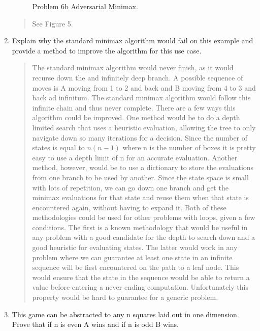 \documentclass[11pt]{article}
\newenvironment{problem}[2][Problem]{\begin{trivlist}
\item[\hskip \labelsep {\bfseries #1}\hskip \labelsep {\bfseries #2.}]}{\end{trivlist}}
\begin{document}
\begin{problem}{6}
\begin{enumerate}
\begin{figure}
			\caption{Problem 6b Adversarial Minimax.}
			\label{fig.bfs}
		\end{figure}
		\begin{verse}
			See Figure 5.
		\end{verse}
	\item Explain why the standard minimax algorithm would fail on this example and provide a method to improve the algorithm for this use case.
	\begin{verse}
		The standard minimax algorithm would never finish, as it would recurse down the and infinitely deep branch. A possible sequence of moves is A moving from 1 to 2 and back and B moving from 4 to 3 and back ad infinitum. The standard minimax algorithm would follow this infinite chain and thus never complete. There are a few ways this algorithm could be improved. One method would be to do a depth limited search that uses a heuristic evaluation, allowing the tree to only navigate down so many iterations for a decision. Since the number of states is equal to $n(n-1)$ where n is the number of boxes it is pretty easy to use a depth limit of n for an accurate evaluation. Another method, however, would be to use a dictionary to store the evaluations from one branch to be used by another. Since the state space is small with lots of repetition, we can go down one branch and get the minimax evaluations for that state and reuse them when that state is encountered again, without having to expand it. Both of these methodologies could be used for other problems with loops, given a few conditions. The first is a known methodology that would be useful in any problem with a good candidate for the depth to search down and a good heuristic for evaluating states. The latter would work in any problem where we can guarantee at least one state in an infinite sequence will be first encountered on the path to a leaf node. This would ensure that the state in the sequence would be able to return a value before entering a never-ending computation. Unfortunately this property would be hard to guarantee for a generic problem.
	\end{verse}
	\item This game can be abstracted to any n squares laid out in one dimension. Prove
			that if n is even A wins and if n is odd B wins.
	\begin{verse}

\end{verse}
\end{enumerate}
\end{problem}
\end{document}
